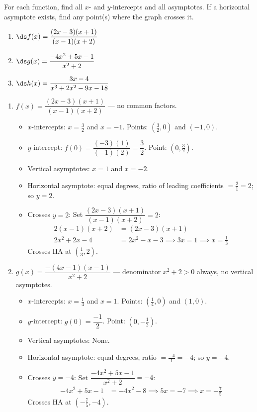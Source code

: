 \documentclass{ximera}
\begin{document}
\begin{problem}
For each function, find all $x$- and $y$-intercepts and all asymptotes. If a horizontal asymptote exists, find any point(s) where the graph crosses it.
\begin{enumerate}
  \item[(a)] $\ds f(x) = \dfrac{(2x-3)(x+1)}{(x-1)(x+2)}$
  \medskip
  \item[(b)] $\ds g(x) = \dfrac{-4x^2+5x-1}{x^2+2}$
  \medskip
  \item[(c)] $\ds h(x) = \dfrac{3x-4}{x^3+2x^2-9x-18}$
\end{enumerate}

\begin{solution}
\begin{enumerate}
  \item[(a)] $f(x) = \dfrac{(2x-3)(x+1)}{(x-1)(x+2)}$ — no common factors.
  \begin{itemize}
    \item $x$-intercepts: $x = \tfrac{3}{2}$ and $x = -1$. Points: $\left(\tfrac{3}{2},0\right)$ and $(-1,0)$.
    \item $y$-intercept: $f(0) = \dfrac{(-3)(1)}{(-1)(2)} = \dfrac{3}{2}$. Point: $\left(0,\tfrac{3}{2}\right)$.
    \item Vertical asymptotes: $x=1$ and $x=-2$.
    \item Horizontal asymptote: equal degrees, ratio of leading coefficients $= \tfrac{2}{1} = 2$; so $y=2$.
    \item Crosses $y=2$: Set $\dfrac{(2x-3)(x+1)}{(x-1)(x+2)}=2$:
    \begin{align*}
      2(x-1)(x+2) &= (2x-3)(x+1)\\
      2x^2+2x-4 &= 2x^2-x-3 \implies 3x=1 \implies x=\tfrac{1}{3}
    \end{align*}
    Crosses HA at $\left(\tfrac{1}{3},2\right)$.
  \end{itemize}

  \item[(b)] $g(x) = \dfrac{-(4x-1)(x-1)}{x^2+2}$ — denominator $x^2+2>0$ always, no vertical asymptotes.
  \begin{itemize}
    \item $x$-intercepts: $x = \tfrac{1}{4}$ and $x = 1$. Points: $\left(\tfrac{1}{4},0\right)$ and $(1,0)$.
    \item $y$-intercept: $g(0) = \dfrac{-1}{2}$. Point: $\left(0,-\tfrac{1}{2}\right)$.
    \item Vertical asymptotes: None.
    \item Horizontal asymptote: equal degrees, ratio $= \tfrac{-4}{1} = -4$; so $y=-4$.
    \item Crosses $y=-4$: Set $\dfrac{-4x^2+5x-1}{x^2+2}=-4$:
    \begin{align*}
      -4x^2+5x-1 &= -4x^2-8 \implies 5x = -7 \implies x = -\tfrac{7}{5}
    \end{align*}
    Crosses HA at $\left(-\tfrac{7}{5},-4\right)$.
  \end{itemize}


\end{enumerate}
\end{solution}
\end{problem}
\end{document}

